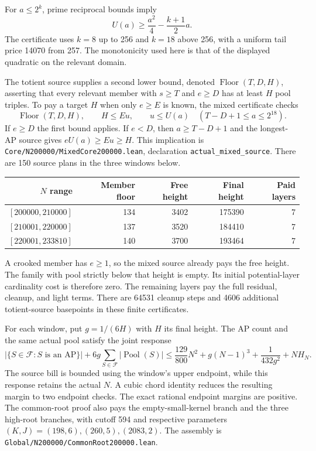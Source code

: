 \documentclass[11pt,a4paper]{article}
\theoremstyle{definition}\newtheorem{definition}[theorem]{Definition}
\newcommand{\F}{\mathcal F}
\newcommand{\code}[1]{{\small\nolinkurl{#1}}}
\begin{document}
For $a\le2^k$, prime reciprocal bounds imply
\[
 U(a)\ge \frac{a^2}{4}-\frac{k+1}{2}a.
\]
The certificate uses $k=8$ up to 256 and $k=18$ above 256, with a
uniform tail price 14070 from 257. The monotonicity used here is that of
the displayed quadratic on the relevant domain.

The totient source supplies a second lower bound, denoted
$\operatorname{Floor}(T,D,H)$, asserting that every relevant member with
$s\ge T$ and $e\ge D$ has at least $H$ pool triples. To pay a target $H$
when only $e\ge E$ is known, the mixed certificate checks
\[
 \operatorname{Floor}(T,D,H),\qquad H\le Eu,\qquad
 u\le U(a)\quad(T-D+1\le a\le2^{18}).
\]
If $e\ge D$ the first bound applies. If $e<D$, then $a\ge T-D+1$
and the longest-AP source gives $eU(a)\ge Eu\ge H$. This implication is
\code{Core/N200000/MixedCore200000.lean}, declaration
\code{actual_mixed_source}. There are 150 source plans in the three
windows below.

\begin{center}
\begin{tabular}{rrrrr}
\toprule
$N$ range & Member floor & Free height & Final height & Paid layers\\
\midrule
$[200000,210000]$ & 134 & 3402 & 175390 & 7\\
$[210001,220000]$ & 137 & 3520 & 184410 & 7\\
$[220001,233810]$ & 140 & 3700 & 193464 & 7\\
\bottomrule
\end{tabular}
\end{center}
A crooked member has $e\ge1$, so the mixed source already pays the
free height. The family with pool strictly below that height is empty.
Its initial potential-layer cardinality cost is therefore zero. The
remaining layers pay the full residual, cleanup, and light terms.
There are 64531 cleanup steps and 4606 additional totient-source
basepoints in these finite certificates.

For each window, put $g=1/(6H)$ with $H$ its final height. The AP count
and the same actual pool satisfy the joint response
\[
 |\{S\in\F:S\text{ is an AP}\}|+
 6g\sum_{S\in\F}|\operatorname{Pool}(S)|
 \le \frac{129}{800}N^2+g(N-1)^3+\frac1{432g^2}+NH_N.
\]
The source bill is bounded using the window's upper endpoint, while
this response retains the actual $N$. A cubic chord identity reduces
the resulting margin to two endpoint checks. The exact rational
endpoint margins are positive. The common-root proof also pays the
empty-small-kernel branch and the three high-root branches, with cutoff
594 and respective parameters $(K,J)=(198,6),(260,5),(2083,2)$.
The assembly is \code{Global/N200000/CommonRoot200000.lean}.
\end{document}
